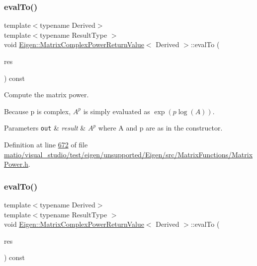 \subsubsection{\texorpdfstring{eval\+To()}{evalTo()}\hspace{0.1cm}{\footnotesize\ttfamily [1/2]}}
{\footnotesize\ttfamily template$<$typename Derived$>$ \\
template$<$typename Result\+Type $>$ \\
void \hyperlink{class_eigen_1_1_matrix_complex_power_return_value}{Eigen\+::\+Matrix\+Complex\+Power\+Return\+Value}$<$ Derived $>$\+::eval\+To (\begin{DoxyParamCaption}\item[{Result\+Type \&}]{res }\end{DoxyParamCaption}) const\hspace{0.3cm}{\ttfamily [inline]}}



Compute the matrix power. 

Because {\ttfamily p} is complex, $ A^p $ is simply evaluated as $ \exp(p \log(A)) $.


\begin{DoxyParams}[1]{Parameters}
\mbox{\tt out}  & {\em result} & $ A^p $ where {\ttfamily A} and {\ttfamily p} are as in the constructor. \\
\hline
\end{DoxyParams}


Definition at line \hyperlink{matio_2visual__studio_2test_2eigen_2unsupported_2_eigen_2src_2_matrix_functions_2_matrix_power_8h_source_l00672}{672} of file \hyperlink{matio_2visual__studio_2test_2eigen_2unsupported_2_eigen_2src_2_matrix_functions_2_matrix_power_8h_source}{matio/visual\+\_\+studio/test/eigen/unsupported/\+Eigen/src/\+Matrix\+Functions/\+Matrix\+Power.\+h}.

\mbox{\label{class_eigen_1_1_matrix_complex_power_return_value_aac9c4065d4711e62af085633a38c4416}} 
\subsubsection{\texorpdfstring{eval\+To()}{evalTo()}\hspace{0.1cm}{\footnotesize\ttfamily [2/2]}}
{\footnotesize\ttfamily template$<$typename Derived$>$ \\
template$<$typename Result\+Type $>$ \\
void \hyperlink{class_eigen_1_1_matrix_complex_power_return_value}{Eigen\+::\+Matrix\+Complex\+Power\+Return\+Value}$<$ Derived $>$\+::eval\+To (\begin{DoxyParamCaption}\item[{Result\+Type \&}]{res }\end{DoxyParamCaption}) const\hspace{0.3cm}{\ttfamily [inline]}}



